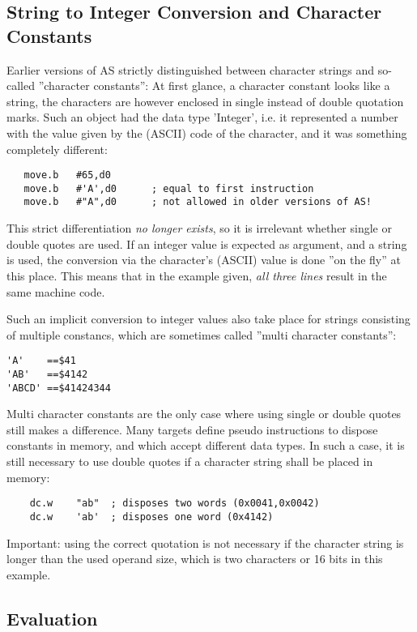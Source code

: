 \documentclass[12pt,twoside]{report}
\begin{document}
\subsection{String to Integer Conversion and Character Constants}

Earlier versions of AS strictly distinguished between character
strings and so-called ''character constants'': At first glance, a
character constant looks like a string, the characters are however
enclosed in single instead of double quotation marks.  Such an object had
the data type 'Integer', i.e. it represented a number with the value
given by the (ASCII) code of the character, and it was something
completely different:

\begin{verbatim}
   move.b   #65,d0
   move.b   #'A',d0      ; equal to first instruction
   move.b   #"A",d0      ; not allowed in older versions of AS!
\end{verbatim}

This strict differentiation {\em no longer exists}, so it is irrelevant
whether single or double quotes are used.  If an integer value
is expected as argument, and a string is used, the conversion via the
character's (ASCII) value is done ''on the fly'' at this place. This
means that in the example given, {\em all three lines} result in the
same machine code.

Such an implicit conversion to integer values also take place for strings
consisting of multiple constancs, which are sometimes called ''multi
character constants'':
\begin{verbatim}
'A'    ==$41
'AB'   ==$4142
'ABCD' ==$41424344
\end{verbatim}
Multi character constants are the only case where using single or double
quotes still makes a difference.  Many targets define pseudo instructions
to dispose constants in memory, and which accept different data types.
In such a case, it is still necessary to use double quotes if a character
string shall be placed in memory:
\begin{verbatim}
    dc.w    "ab"  ; disposes two words (0x0041,0x0042)
    dc.w    'ab'  ; disposes one word (0x4142)
\end{verbatim}
Important: using the correct quotation is not necessary if the character
string is longer than the used operand size, which is two characters or
16 bits in this example.

\subsection{Evaluation}
\end{document}
